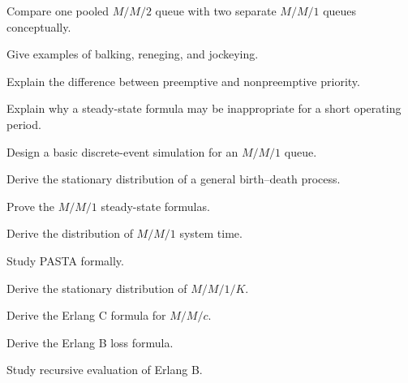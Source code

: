 \begin{exercise}[3]
Compare one pooled \(M/M/2\) queue with two separate \(M/M/1\) queues
conceptually.
\end{exercise}

\begin{exercise}[3]
Give examples of balking, reneging, and jockeying.
\end{exercise}

\begin{exercise}[3]
Explain the difference between preemptive and nonpreemptive priority.
\end{exercise}

\begin{exercise}[3]
Explain why a steady-state formula may be inappropriate for a short
operating period.
\end{exercise}

\begin{exercise}[3]
Design a basic discrete-event simulation for an \(M/M/1\) queue.
\end{exercise}

\begin{exercise}[4]
Derive the stationary distribution of a general birth--death process.
\end{exercise}

\begin{exercise}[4]
Prove the \(M/M/1\) steady-state formulas.
\end{exercise}

\begin{exercise}[4]
Derive the distribution of \(M/M/1\) system time.
\end{exercise}

\begin{exercise}[4]
Study PASTA formally.
\end{exercise}

\begin{exercise}[4]
Derive the stationary distribution of \(M/M/1/K\).
\end{exercise}

\begin{exercise}[4]
Derive the Erlang C formula for \(M/M/c\).
\end{exercise}

\begin{exercise}[4]
Derive the Erlang B loss formula.
\end{exercise}

\begin{exercise}[4]
Study recursive evaluation of Erlang B.
\end{exercise}

